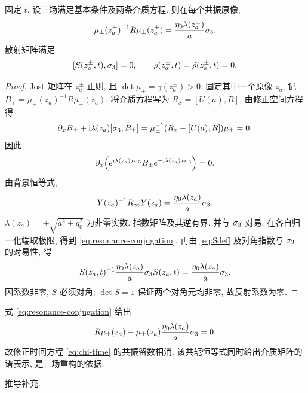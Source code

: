 \begin{proposition}\label{prop:resonance}
固定 $t$. 设三场满足基本条件及两条介质方程. 则在每个共振原像,
\begin{equation}\label{eq:resonance-conjugation}
\mu_\pm(z_a^\pm)^{-1}R\mu_\pm(z_a^\pm)
=\dfrac{\eta_0\lambda(z_a^\pm)}{a}\sigma_3.
\end{equation}
散射矩阵满足
\begin{equation}\label{eq:resonance-reflection}
[S(z_a^\pm,t),\sigma_3]=0,\qquad
\rho(z_a^\pm,t)=\widetilde\rho(z_a^\pm,t)=0.
\end{equation}
\end{proposition}
\begin{proof}
Jost 矩阵在 $z_a^\pm$ 正则, 且 $\det\mu_\pm=\gamma(z_a^\pm)>0$.
固定其中一个原像 $z_a$, 记 $B_\pm=\mu_\pm(z_a)^{-1}R\mu_\pm(z_a)$.
将介质方程写为 $R_x=[U(a),R]$, 由修正空间方程得
\begin{equation*}
\partial_x B_\pm+\mathrm{i}\lambda(z_a)[\sigma_3,B_\pm]
=\mu_\pm^{-1}(R_x-[U(a),R])\mu_\pm=0.
\end{equation*}
因此
\begin{equation*}
\partial_x\!\left(e^{\mathrm{i}\lambda(z_a)x\sigma_3}B_\pm e^{-\mathrm{i}\lambda(z_a)x\sigma_3}\right)=0.
\end{equation*}
由背景恒等式,
\begin{equation*}
Y(z_a)^{-1}R_\infty Y(z_a)=\dfrac{\eta_0\lambda(z_a)}{a}\sigma_3.
\end{equation*}
$\lambda(z_a)=\pm\sqrt{a^2+q_0^2}$ 为非零实数.
指数矩阵及其逆有界, 并与 $\sigma_3$ 对易. 在各自归一化端取极限, 得到 \eqref{eq:resonance-conjugation}.
再由 \eqref{eq:Sdef} 及对角指数与 $\sigma_3$ 的对易性, 得
\begin{equation*}
S(z_a,t)^{-1}\dfrac{\eta_0\lambda(z_a)}{a}\sigma_3 S(z_a,t)
=\dfrac{\eta_0\lambda(z_a)}{a}\sigma_3.
\end{equation*}
因系数非零, $S$ 必须对角; $\det S=1$ 保证两个对角元均非零, 故反射系数为零.
\end{proof}
\begin{remark}
式 \eqref{eq:resonance-conjugation} 给出
\begin{equation*}
R\mu_\pm(z_a)-\mu_\pm(z_a)\dfrac{\eta_0\lambda(z_a)}{a}\sigma_3=0.
\end{equation*}
故修正时间方程 \eqref{eq:chi-time} 的共振留数相消.
该共轭恒等式同时给出介质矩阵的谱表示, 是三场重构的依据.
\end{remark}

\par\medskip\noindent 推导补充.\par

